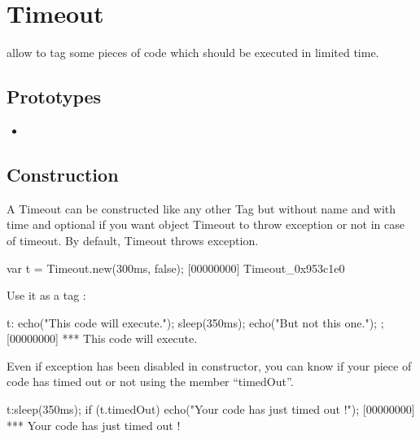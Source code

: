 \section{Timeout}

 allow to tag some pieces of code which should be
executed in limited time.

\subsection{Prototypes}
\begin{itemize}
\item {}
\end{itemize}

\subsection{Construction}
A Timeout can be constructed like any other Tag but without name and
with time and optional if you want object Timeout to throw exception
or not in case of timeout. By default, Timeout throws exception.

\begin{urbiscript}
var t = Timeout.new(300ms, false);
[00000000] Timeout_0x953c1e0
\end{urbiscript}

Use it as a tag :

\begin{urbiscript}[firstnumber=last]
t:{
  echo("This code will execute.");
  sleep(350ms);
  echo("But not this one.");
};
[00000000] *** This code will execute.
\end{urbiscript}

Even if exception has been disabled in constructor, you can know if
your piece of code has timed out or not using the member ``timedOut''.

\begin{urbiscript}[firstnumber=last]
t:sleep(350ms);
if (t.timedOut)
  echo("Your code has just timed out !");
[00000000] *** Your code has just timed out !
\end{urbiscript}

